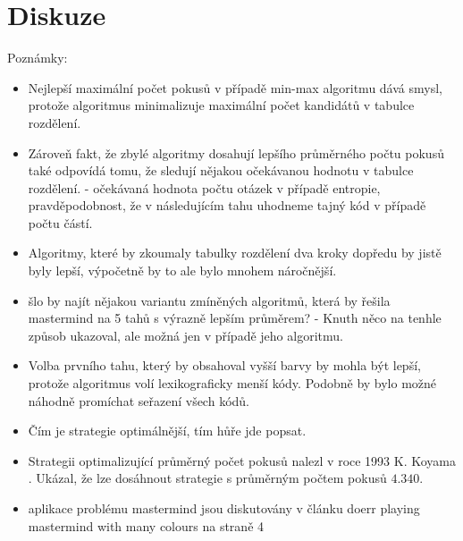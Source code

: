 \section{Diskuze}



Poznámky:
\begin{itemize}
    \item Nejlepší maximální počet pokusů v případě min-max algoritmu dává smysl, protože algoritmus minimalizuje maximální počet kandidátů v tabulce rozdělení. 
    \item Zároveň fakt, že zbylé algoritmy dosahují lepšího průměrného počtu pokusů také odpovídá tomu, že sledují nějakou očekávanou hodnotu v tabulce rozdělení. - očekávaná hodnota počtu otázek v případě entropie, pravděpodobnost, že v následujícím tahu uhodneme tajný kód v případě počtu částí. 
    \item Algoritmy, které by zkoumaly tabulky rozdělení dva kroky dopředu by jistě byly lepší, výpočetně by to ale bylo mnohem náročnější.
    \item šlo by najít nějakou variantu zmíněných algoritmů, která by řešila mastermind na 5 tahů s výrazně lepším průměrem? - Knuth něco na tenhle způsob ukazoval, ale možná jen v případě jeho algoritmu.
    \item Volba prvního tahu, který by obsahoval vyšší barvy by mohla být lepší, protože algoritmus volí lexikograficky menší kódy. Podobně by bylo možné náhodně promíchat seřazení všech kódů. 
    \item Čím je strategie optimálnější, tím hůře jde popsat.
    \item Strategii optimalizující průměrný počet pokusů nalezl v roce 1993 K. Koyama \cite{koyama}. Ukázal, že lze dosáhnout strategie s průměrným počtem pokusů $4.340$.
    \item aplikace problému mastermind jsou diskutovány v článku doerr playing mastermind with many colours na straně 4
\end{itemize}





